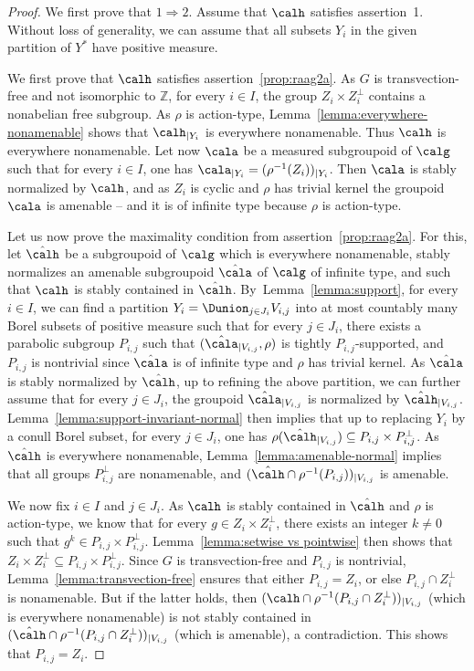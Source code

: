 \begin{proof}
We first prove that $1\Rightarrow 2.$ Assume that $\calh$ satisfies assertion~1. Without loss of generality, we can assume that all subsets $Y_i$ in the given partition of $Y^*$ have positive measure.\enlargethispage{.8\baselineskip}%

We first prove that $\calh$ satisfies assertion~\eqref{prop:raag2a}. As $G$ is transvection-free and not isomorphic to $\mathbb{Z}$, for every $i\in I$, the group $Z_i\times Z_i^{\perp}$ contains a nonabelian free subgroup. As $\rho$ is action-type, Lemma~\ref{lemma:everywhere-nonamenable} shows that $\calh_{|Y_i}$ is everywhere nonamenable. Thus $\calh$ is everywhere nonamenable. Let now $\cala$ be a measured subgroupoid of $\calg$ such that for every $i\in I$, one has $\cala_{|Y_i}=(\rho^{-1}(Z_i))_{|Y_i}$. Then $\cala$ is stably normalized by $\calh$, and as $Z_i$ is cyclic and $\rho$ has trivial kernel the groupoid $\cala$ is amenable -- and it is of infinite type because $\rho$ is action-type.

Let us now prove the maximality condition from assertion~\eqref{prop:raag2a}. For this, let $\hat{\calh}$ be a subgroupoid of $\calg$ which is everywhere nonamenable, stably normalizes an amenable subgroupoid $\hat{\cala}$ of $\calg$ of infinite type, and such that $\calh$ is stably contained in $\hat{\calh}$. By~Lemma~\ref{lemma:support}, for every $i\in I$, we can find a partition $Y_i=\Dunion_{j\in J_i} V_{i,j}$ into at most countably many Borel subsets of positive measure such that for every $j\in J_i$, there exists a parabolic subgroup $P_{i,j}$ such that $(\hat\cala_{|V_{i,j}},\rho)$ is tightly $P_{i,j}$-supported, and $P_{i,j}$ is nontrivial since $\hat\cala$ is of infinite type and $\rho$ has trivial kernel. As $\hat\cala$ is stably normalized by $\hat\calh$, up to refining the above partition, we can further assume that for every $j\in J_i$, the groupoid $\hat\cala_{|V_{i,j}}$ is normalized by $\hat\calh_{|V_{i,j}}$. Lemma~\ref{lemma:support-invariant-normal} then implies that up to replacing $Y_i$ by a conull Borel subset, for every $j\in J_i$, one has $\rho(\hat\calh_{|V_{i,j}})\subseteq P_{i,j}\times P_{i,j}^{\perp}$.
As $\hat\calh$ is everywhere nonamenable, Lemma~\ref{lemma:amenable-normal} implies that all groups $P_{i,j}^{\perp}$ are nonamenable, and $(\hat\calh\cap\rho^{-1}(P_{i,j}))_{|V_{i,j}}$ is amenable.

We now fix $i\in I$ and $j\in J_i$. As $\calh$ is stably contained in $\hat\calh$ and $\rho$ is action-type, we know that for every $g\in Z_i\times Z_i^\perp$, there exists an integer $k\neq 0$ such that $g^k\in P_{i,j}\times P_{i,j}^{\perp}$. Lemma~\ref{lemma:setwise vs pointwise} then shows that $Z_i\times Z_i^\perp\subseteq P_{i,j}\times P_{i,j}^{\perp}$. Since $G$ is transvection-free and $P_{i,j}$ is nontrivial, Lemma~\ref{lemma:transvection-free} ensures that either $P_{i,j}=Z_i$, or else $P_{i,j}\cap Z_i^{\perp}$ is nonamenable. But if the latter holds, then $(\calh\cap\rho^{-1}(P_{i,j}\cap Z_i^\perp))_{|V_{i,j}}$ (which is everywhere nonamenable) is not stably contained in $(\hat\calh\cap\rho^{-1}(P_{i,j}\cap Z_i^{\perp}))_{|V_{i,j}}$ (which is amenable), a contradiction. This shows that $P_{i,j}=Z_i$.


\end{proof}
